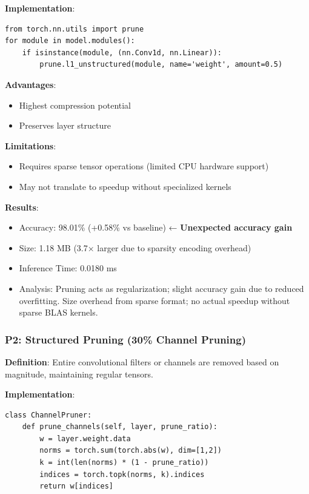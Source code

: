 \documentclass[12pt, a4paper]{article}
\begin{document}
\textbf{Implementation}:
\begin{lstlisting}
from torch.nn.utils import prune
for module in model.modules():
    if isinstance(module, (nn.Conv1d, nn.Linear)):
        prune.l1_unstructured(module, name='weight', amount=0.5)
\end{lstlisting}

\textbf{Advantages}:
\begin{itemize}
    \item Highest compression potential
    \item Preserves layer structure
\end{itemize}

\textbf{Limitations}:
\begin{itemize}
    \item Requires sparse tensor operations (limited CPU hardware support)
    \item May not translate to speedup without specialized kernels
\end{itemize}

\textbf{Results}:
\begin{itemize}
    \item Accuracy: 98.01\% (+0.58\% vs baseline) ← \textbf{Unexpected accuracy gain}
    \item Size: 1.18 MB (3.7× larger due to sparsity encoding overhead)
    \item Inference Time: 0.0180 ms
    \item Analysis: Pruning acts as regularization; slight accuracy gain due to reduced overfitting. Size overhead from sparse format; no actual speedup without sparse BLAS kernels.
\end{itemize}

\subsubsection{P2: Structured Pruning (30\% Channel Pruning)}

\textbf{Definition}: Entire convolutional filters or channels are removed based on magnitude, maintaining regular tensors.

\textbf{Implementation}:
\begin{lstlisting}
class ChannelPruner:
    def prune_channels(self, layer, prune_ratio):
        w = layer.weight.data
        norms = torch.sum(torch.abs(w), dim=[1,2])
        k = int(len(norms) * (1 - prune_ratio))
        indices = torch.topk(norms, k).indices
        return w[indices]
\end{lstlisting}
\end{document}
